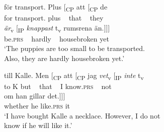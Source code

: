 \documentclass[output=paper,colorlinks,citecolor=brown,draft,draftmode]{langscibook}
\begin{document}
\gll     för    transport.  Plus  [\textsubscript{CP}  att      [\textsubscript{CP}  de\\
    for    transport.  plus   ~ that   ~   they     \\
\gll     \textit{{är}}\textsubscript{v} [\textsubscript{IP}    \textit{{knappast}} t\textsubscript{v}   rumsrena      än.]]]  \\
    be.\textsc{prs}  ~  hardly  ~     housebroken    yet\\
\glt `The puppies are too small to be transported.   \\
    Also, they are hardly housebroken yet.’  \\


\gll     till    Kalle.  Men [\textsubscript{CP}  att [\textsubscript{CP}  jag  \textit{{vet}}\textsubscript{v} [\textsubscript{IP}    \textit{{inte}} t\textsubscript{v}   \\
    to    K    but   ~ that  ~  I    know.\textsc{prs} ~ not ~ \\
\gll     om      han  gillar      det.]]]  \\
    whether  he    like.\textsc{prs}    it\\
\glt `I have bought Kalle a necklace. However, I do not   \\
    know if he will like it.’
\z
\z\largerpage[2]
\end{document}
